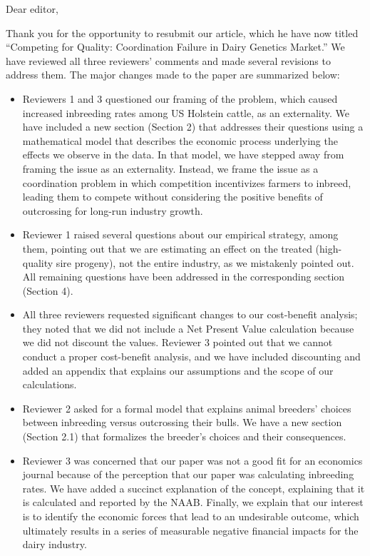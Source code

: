 \documentclass[12pt]{article}
\date{} %
\begin{document}

Dear editor,

Thank you for the opportunity to resubmit our article, which he have now titled “Competing for Quality: Coordination Failure in Dairy Genetics Market.” We have reviewed all three reviewers' comments and made several revisions to address them. The major changes made to the paper are summarized below:

\begin{itemize}
    \item Reviewers 1 and 3 questioned our framing of the problem, which caused increased inbreeding rates among US Holstein cattle, as an externality. We have included a new section (Section 2) that addresses their questions using a mathematical model that describes the economic process underlying the effects we observe in the data. In that model, we have stepped away from framing the issue as an externality. Instead, we frame the issue as a coordination problem in which competition incentivizes farmers to inbreed, leading them to compete without considering the positive benefits of outcrossing for long-run industry growth.
    \item Reviewer 1 raised several questions about our empirical strategy, among them, pointing out that we are estimating an effect on the treated (high-quality sire progeny), not the entire industry, as we mistakenly pointed out. All remaining questions have been addressed in the corresponding section (Section 4).
    \item All three reviewers requested significant changes to our cost-benefit analysis; they noted that we did not include a Net Present Value calculation because we did not discount the values. Reviewer 3 pointed out that we cannot conduct a proper cost-benefit analysis, and we have included discounting and added an appendix that explains our assumptions and the scope of our calculations.
    \item Reviewer 2 asked for a formal model that explains animal breeders' choices between inbreeding versus outcrossing their bulls. We have a new section (Section 2.1) that formalizes the breeder's choices and their consequences.
    \item Reviewer 3 was concerned that our paper was not a good fit for an economics journal because of the perception that our paper was calculating inbreeding rates. We have added a succinct explanation of the concept, explaining that it is calculated and reported by the NAAB. Finally, we explain that our interest is to identify the economic forces that lead to an undesirable outcome, which ultimately results in a series of measurable negative financial impacts for the dairy industry.

\end{itemize}
\end{document}
